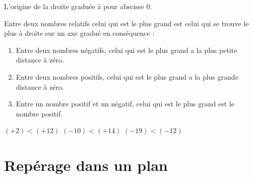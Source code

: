 \documentclass[a4paper,10pt]{report}
\begin{document}
\begin{rem}
L'origine de la droite graduée à pour abscisse $0$.
\end{rem}

\begin{prop}
Entre deux nombres relatifs celui qui est le plus grand est celui qui se trouve le plus à droite sur un axe gradué en conséquence :
\begin{enumerate}
\item[•] Entre deux nombres négatifs, celui qui est le plus grand a la plus petite distance à zéro.
\item[•] Entre deux nombres positifs, celui qui est le plus grand a la plus grande distance à zéro.
\item[•] Entre un nombre positif et un négatif, celui qui est le plus grand est le nombre positif.
\end{enumerate}
\end{prop}

\begin{ex}
\begin{center}
$(+2)<(+12)$ \hspace{3cm} $(-10) <(+14)$ \hspace{3cm} $(-19)< (-12)$
\end{center}

\begin{center}
\end{center}
\end{ex}

\section{Repérage dans un plan}
\end{document}
